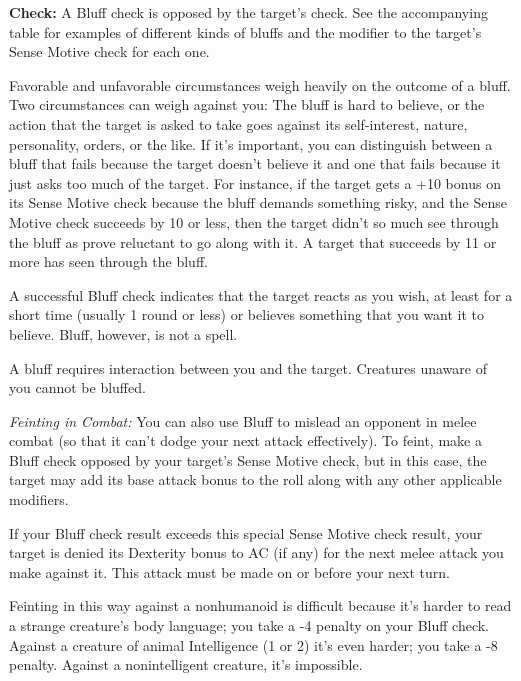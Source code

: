 
\textbf{Check:} A Bluff check is opposed by the target's  check. See 
the accompanying table for examples of different kinds of bluffs and the modifier 
to the target's Sense Motive check for each one.

Favorable and unfavorable circumstances weigh heavily on the outcome of a bluff. 
Two circumstances can weigh against you: The bluff is hard to believe, or the action 
that the target is asked to take goes against its self-interest, nature, personality, 
orders, or the like. If it's important, you can distinguish between a bluff that 
fails because the target doesn't believe it and one that fails because it just 
asks too much of the target. For instance, if the target gets a +10 bonus on its 
Sense Motive check because the bluff demands something risky, and the Sense Motive 
check succeeds by 10 or less, then the target didn't so much see through the bluff 
as prove reluctant to go along with it. A target that succeeds by 11 or more has 
seen through the bluff.

A successful Bluff check indicates that the target reacts as you wish, at least 
for a short time (usually 1 round or less) or believes something that you want 
it to believe. Bluff, however, is not a  spell. 

A bluff requires interaction between you and the target. Creatures unaware of you 
cannot be bluffed.

\textit{Feinting in Combat:} You can also use Bluff to mislead an opponent in melee 
combat (so that it can't dodge your next attack effectively). To feint, make a 
Bluff check opposed by your target's Sense Motive check, but in this case, the 
target may add its base attack bonus to the roll along with any other applicable 
modifiers.

If your Bluff check result exceeds this special Sense Motive check result, your 
target is denied its Dexterity bonus to AC (if any) for the next melee attack you 
make against it. This attack must be made on or before your next turn.

Feinting in this way against a nonhumanoid is difficult because it's harder to 
read a strange creature's body language; you take a -4 penalty on your Bluff check. 
Against a creature of animal Intelligence (1 or 2) it's even harder; you take a 
-8 penalty. Against a nonintelligent creature, it's impossible.

